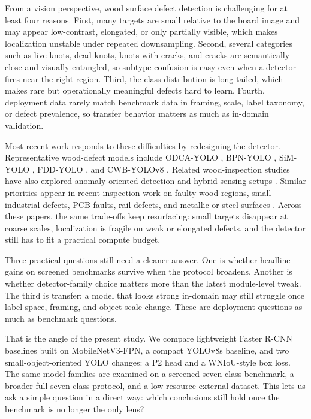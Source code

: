 From a vision perspective, wood surface defect detection is challenging for at least four reasons. First, many targets are small relative to the board image and may appear low-contrast, elongated, or only partially visible, which makes localization unstable under repeated downsampling. Second, several categories such as live knots, dead knots, knots with cracks, and cracks are semantically close and visually entangled, so subtype confusion is easy even when a detector fires near the right region. Third, the class distribution is long-tailed, which makes rare but operationally meaningful defects hard to learn. Fourth, deployment data rarely match benchmark data in framing, scale, label taxonomy, or defect prevalence, so transfer behavior matters as much as in-domain validation.

Most recent work responds to these difficulties by redesigning the detector. Representative wood-defect models include ODCA-YOLO \citep{odca_yolo}, BPN-YOLO \citep{bpn_yolo}, SiM-YOLO \citep{sim_yolo}, FDD-YOLO \citep{fdd_yolo}, and CWB-YOLOv8 \citep{an_cwb_yolov8}. Related wood-inspection studies have also explored anomaly-oriented detection and hybrid sensing setups \citep{kilic_2024,kilic_2025_wd_detector}. Similar priorities appear in recent inspection work on faulty wood regions, small industrial defects, PCB faults, rail defects, and metallic or steel surfaces \citep{cmc_wood_area_attention,cmc_insulator_small,cmc_pcb_yolov8,cmc_cg_yolov8,cmc_rail_upernet,cmc_yolo_rlc,cmc_lmvit,cmc_msese,cmc_flame,cmc_channel_shuffle}. Across these papers, the same trade-offs keep resurfacing: small targets disappear at coarse scales, localization is fragile on weak or elongated defects, and the detector still has to fit a practical compute budget.

Three practical questions still need a cleaner answer. One is whether headline gains on screened benchmarks survive when the protocol broadens. Another is whether detector-family choice matters more than the latest module-level tweak. The third is transfer: a model that looks strong in-domain may still struggle once label space, framing, and object scale change. These are deployment questions as much as benchmark questions.

That is the angle of the present study. We compare lightweight Faster R-CNN baselines built on MobileNetV3-FPN, a compact YOLOv8s baseline, and two small-object-oriented YOLO changes: a P2 head and a WNIoU-style box loss. The same model families are examined on a screened seven-class benchmark, a broader full seven-class protocol, and a low-resource external dataset. This lets us ask a simple question in a direct way: which conclusions still hold once the benchmark is no longer the only lens?

